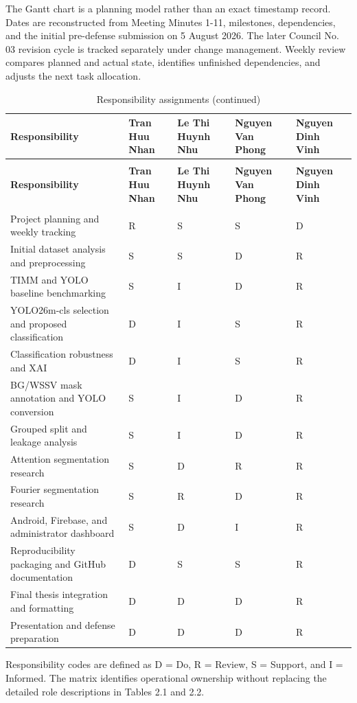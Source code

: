 \documentclass[12pt,a4paper]{report}
\newenvironment{revisionblock}{\begin{snugshade}\noindent}{\end{snugshade}}
\begin{document}
\begin{revisionblock}
The Gantt chart is a planning model rather than an exact timestamp record. Dates are reconstructed from Meeting Minutes 1-11, milestones, dependencies, and the initial pre-defense submission on 5 August 2026. The later Council No. 03 revision cycle is tracked separately under change management. Weekly review compares planned and actual state, identifies unfinished dependencies, and adjusts the next task allocation.
\end{revisionblock}
\begingroup
\scriptsize
\setlength{\tabcolsep}{2pt}
\renewcommand{\arraystretch}{1.16}
\begin{longtable}{|>{\centering\arraybackslash}p{4.50cm}|>{\centering\arraybackslash}p{2.60cm}|>{\centering\arraybackslash}p{2.60cm}|>{\centering\arraybackslash}p{2.60cm}|>{\centering\arraybackslash}p{2.60cm}|}
\caption{Responsibility assignments}\\
\hline
\rowcolor{HeaderPeach}\textbf{Responsibility} & \textbf{Tran Huu Nhan} & \textbf{Le Thi Huynh Nhu} & \textbf{Nguyen Van Phong} & \textbf{Nguyen Dinh Vinh} \\ \hline
\endfirsthead
\caption[]{Responsibility assignments (continued)}\\
\hline
\rowcolor{HeaderPeach}\textbf{Responsibility} & \textbf{Tran Huu Nhan} & \textbf{Le Thi Huynh Nhu} & \textbf{Nguyen Van Phong} & \textbf{Nguyen Dinh Vinh} \\ \hline
\endhead
\hline
\multicolumn{5}{r}{\footnotesize Continued on next page}\\
\endfoot
\hline
\endlastfoot
Project planning and weekly tracking & R & S & S & D \\ \hline
Initial dataset analysis and preprocessing & S & S & D & R \\ \hline
TIMM and YOLO baseline benchmarking & S & I & D & R \\ \hline
YOLO26m-cls selection and proposed classification & D & I & S & R \\ \hline
Classification robustness and XAI & D & I & S & R \\ \hline
BG/WSSV mask annotation and YOLO conversion & S & I & D & R \\ \hline
Grouped split and leakage analysis & S & I & D & R \\ \hline
Attention segmentation research & S & D & R & R \\ \hline
Fourier segmentation research & S & R & D & R \\ \hline
Android, Firebase, and administrator dashboard & S & D & I & R \\ \hline
Reproducibility packaging and GitHub documentation & D & S & S & R \\ \hline
Final thesis integration and formatting & D & D & D & R \\ \hline
Presentation and defense preparation & D & D & D & R \\ \hline
\end{longtable}
\endgroup
Responsibility codes are defined as D = Do, R = Review, S = Support, and I = Informed. The matrix identifies operational ownership without replacing the detailed role descriptions in Tables 2.1 and 2.2.\par
\end{document}
